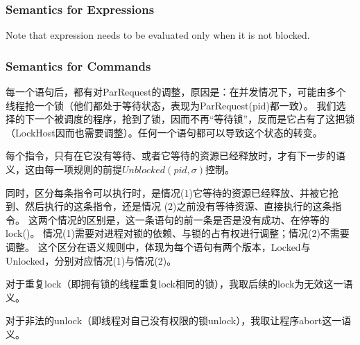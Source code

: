 \documentclass[UTF8, 8pt, a4paper ]{ctexart}
\begin{document}
\begin{small}
	\subsubsection{Semantics for Expressions}

	Note that expression needs to be evaluated only when it is not blocked. 
	
	
	\subsubsection{Semantics for Commands}

	每一个语句后，都有对ParRequest的调整，原因是：在并发情况下，可能由多个线程抢一个锁（他们都处于等待状态，表现为ParRequest(pid)都一致）。
	我们选择的下一个被调度的程序，抢到了锁，因而不再“等待锁”，反而是它占有了这把锁（LockHost因而也需要调整）。任何一个语句都可以导致这个状态的转变。
	
	每个指令，只有在它没有等待、或者它等待的资源已经释放时，才有下一步的语义，这由每一项规则的前提\textbf{$Unblocked(pid, \sigma)$}控制。
	
	同时，区分每条指令可以执行时，是情况(1)它等待的资源已经释放、并被它抢到、然后执行的这条指令，还是情况
	(2)之前没有等待资源、直接执行的这条指令。
	这两个情况的区别是，这一条语句的前一条是否是没有成功、在停等的lock()。
	情况(1)需要对进程对锁的依赖、与锁的占有权进行调整；情况(2)不需要调整。
	这个区分在语义规则中，体现为每个语句有两个版本，Locked与Unlocked，分别对应情况(1)与情况(2)。

	对于重复lock（即拥有锁的线程重复lock相同的锁），我取后续的lock为无效这一语义。

	对于非法的unlock（即线程对自己没有权限的锁unlock），我取让程序abort这一语义。%

	\vspace{0.2cm}

	

\end{small}
\end{document}
